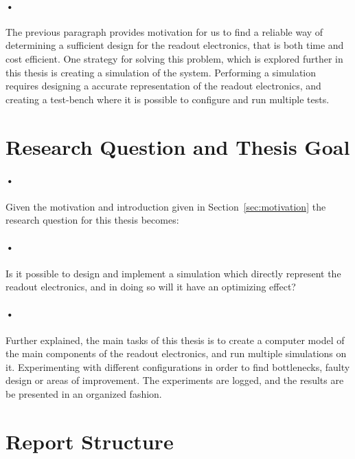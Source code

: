 \documentclass[a4paper, 12pt]{report}
\begin{document}
\paragraph{•}
The previous paragraph provides motivation for us to find a reliable way of determining a sufficient design for the readout electronics, that is both time and cost efficient.
One strategy for solving this problem, which is explored further in this thesis is creating a simulation of the system.
Performing a simulation requires designing a accurate representation of the readout electronics, and creating a test-bench where it is possible to configure and run multiple tests.


\section{Research Question and Thesis Goal}

\paragraph{•}
Given the motivation and introduction given in Section~\ref{sec:motivation} the research question for this thesis becomes:

\paragraph{•}
Is it possible to design and implement a simulation which directly represent the readout electronics, and in doing so will it have an optimizing effect?

\paragraph{•}
Further explained, the main tasks of this thesis is to create a computer model of the main components of the readout electronics, and run multiple simulations on it.
Experimenting with different configurations in order to find bottlenecks, faulty design or areas of improvement.
The experiments are logged, and the results are be presented in an organized fashion.


\section{Report Structure}
\end{document}
